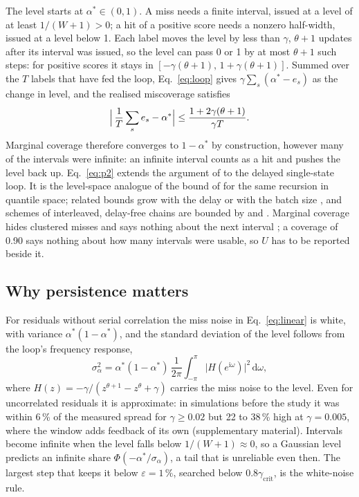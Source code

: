 The level starts at $\alpha^\ast \in (0, 1)$. A miss needs a finite interval, issued at a level
of at least $1/(W+1) > 0$; a hit of a positive score needs a nonzero half-width, issued at a level
below 1. Each label moves the level by less than $\gamma$, $\theta + 1$ updates after its interval
was issued, so the level can pass 0 or 1 by at most $\theta + 1$ such steps: for positive scores
it stays in $[-\gamma(\theta+1),\, 1 + \gamma(\theta+1)]$. Summed over the $T$ labels that have
fed the loop, Eq.~\eqref{eq:loop} gives $\gamma\sum_s (\alpha^\ast - e_s)$ as the change in level,
and the realised miscoverage satisfies
\begin{equation}
  \Bigl|\, \frac{1}{T}\sum_s e_s - \alpha^\ast \Bigr| \le \frac{1 + 2\gamma(\theta+1)}{\gamma T}.
  \label{eq:p2}
\end{equation}
Marginal coverage therefore converges to $1 - \alpha^\ast$ by construction, however many of the
intervals were infinite: an infinite interval counts as a hit and pushes the level back up.
Eq.~\eqref{eq:p2} extends the argument of \citet{gibbs2021aci} to the delayed single-state loop.
It is the level-space analogue of the bound of \citet[Cor.~1]{wang2024acmcp} for the same
recursion in quantile space; related bounds grow with the delay \citep[Thm.~2]{ding2025multiqt} or
with the batch size \citep[Thm.~4.1]{areces2025}, and schemes of interleaved, delay-free chains are
bounded by \citet{elhalabi2026} and \citet{cherenson2026}. Marginal
coverage hides clustered misses \citep{retzlaff2025} and says nothing about the next interval
\citep{li2026breaks}; a coverage of 0.90 says nothing about how many intervals were usable, so $U$
has to be reported beside it.

\subsection{Why persistence matters}\label{sec:analysis:persistence}

For residuals without serial correlation the miss noise in Eq.~\eqref{eq:linear} is white, with
variance $\alpha^\ast(1-\alpha^\ast)$, and the standard deviation of the level follows from the
loop's frequency response,
\begin{equation}
  \sigma_\alpha^2 = \alpha^\ast(1-\alpha^\ast)\,\frac{1}{2\pi}\int_{-\pi}^{\pi}
  \bigl|H(e^{\mathrm{i}\omega})\bigr|^2\,\mathrm{d}\omega,
  \label{eq:noisegain}
\end{equation}
where $H(z) = -\gamma/(z^{\theta+1} - z^{\theta} + \gamma)$ carries the miss noise to the level.
Even for uncorrelated residuals it is approximate: in simulations before the study it was within
6\,\% of the measured spread for $\gamma \ge 0.02$ but 22 to 38\,\% high at $\gamma = 0.005$, where
the window adds feedback of its own (supplementary material). Intervals become
infinite when the level falls below $1/(W+1) \approx 0$, so a Gaussian level predicts an infinite
share $\Phi(-\alpha^\ast/\sigma_\alpha)$, a tail that is unreliable even then. The largest step
that keeps it below $\varepsilon = 1\,\%$, searched below $0.8\gamma_{\mathrm{crit}}$, is the
white-noise rule.

